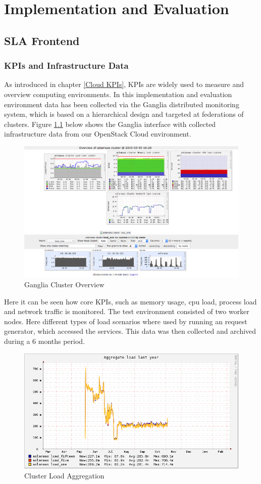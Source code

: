 
\chapter{Implementation and Evaluation} %
\label{Evaluation} %

\section{SLA Frontend}

\subsection{KPIs and Infrastructure Data}
As introduced in chapter \ref{Cloud KPIs}, KPIs are widely used to measure and overview computing environments. In this implementation and evaluation environment data has been collected via the Ganglia \cite{Ganglia} distributed monitoring system, which is based on a hierarchical design and targeted at federations of clusters. Figure \ref{fig:monidata} below shows the Ganglia interface with collected infrastructure data from our OpenStack Cloud environment.

\begin{figure}[ht]
	\centering
	\includegraphics[width=0.7\linewidth]{chapters/chapter5/fig/monidata_cluster}
	\caption{Ganglia Cluster Overview}
	\label{fig:monidata}
\end{figure}

Here it can be seen how core KPIs, such as memory usage, cpu load, process load and network traffic is monitored. The test environment consisted of two worker nodes. Here different types of load scenarios where used by running an request generator, which accessed the services. This data was then collected and archived during a 6 months period.

\begin{figure}[ht]
	\centering
	\includegraphics[width=0.7\linewidth]{chapters/chapter5/fig/monidataloadlast}
	\caption{Cluster Load Aggregation}
	\label{fig:monidata2}
\end{figure}

